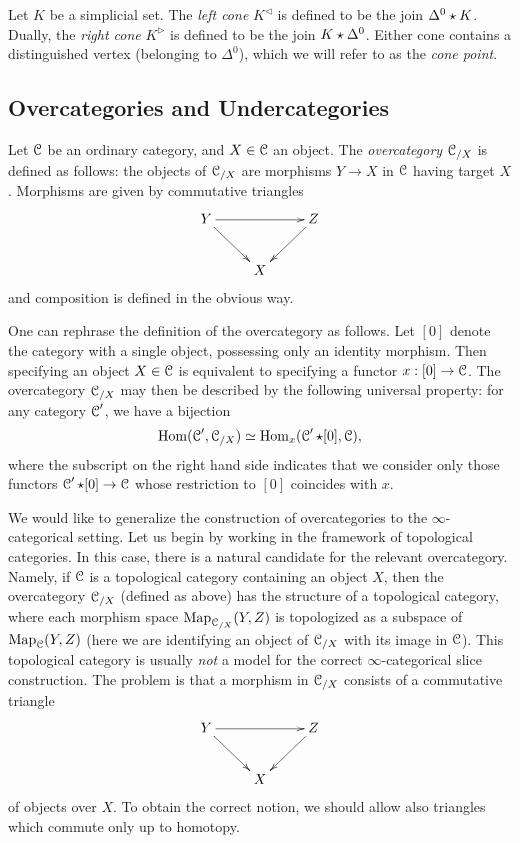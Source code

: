 \begin{1.2.8 Joins of inf-cats}
\begin{notation}
Let $K$ be a simplicial set. The {\it left cone} $K^{\triangleleft}$ is defined to be
the join $\Delta^0 \star K$. Dually, the {\it right cone} $K^{\triangleright}$ is defined to be the join $K \star \Delta^0$. Either cone contains a distinguished vertex (belonging to $\Delta^0$), which we will refer to as the {\it cone point}.
\end{notation}
\end{1.2.8 Joins of inf-cats}
\subsection{Overcategories and Undercategories}\label{slices}
\begin{1.2.9 Over- and under-categories}
Let $\operatorname{\mathcal{C}}$ be an ordinary category, and $X \in \operatorname{\mathcal{C}}$ an object.
The {\it overcategory} $\operatorname{\mathcal{C}}_{/X}$ is defined as follows:
the objects of $\operatorname{\mathcal{C}}_{/X}$ are
morphisms $Y \rightarrow X$ in $\operatorname{\mathcal{C}}$ having target $X$.
Morphisms are given by commutative triangles
$$\xymatrix{ Y \ar[dr] \ar[rr] & & Z \ar[dl] \\
& X }$$
and composition is defined in the obvious way.

One can rephrase the definition of the overcategory as follows.
Let $[0]$ denote the category with a single object, possessing
only an identity morphism. Then specifying an object $X \in \operatorname{\mathcal{C}}$
is equivalent to specifying a functor $x: [0] \rightarrow
\operatorname{\mathcal{C}}$. The overcategory $\operatorname{\mathcal{C}}_{/X}$ may then be described by
the following universal property: for any category $\operatorname{\mathcal{C}}'$, we
have a bijection
$$ \operatorname{Hom}(\operatorname{\mathcal{C}}', \operatorname{\mathcal{C}}_{/X}) \simeq \operatorname{Hom}_{x}(\operatorname{\mathcal{C}}' \star [0],
\operatorname{\mathcal{C}}),$$ where the subscript on the right hand side indicates
that we consider only those functors $\operatorname{\mathcal{C}}' \star [0]
\rightarrow \operatorname{\mathcal{C}}$ whose restriction to $[0]$ coincides with
$x$.

We would like to generalize the construction of overcategories to the $\infty$-categorical setting. 
Let us begin by working in the framework of topological categories. In this case, there is a natural candidate for the relevant overcategory. Namely, if $\operatorname{\mathcal{C}}$ is a topological category containing an object $X$, then the overcategory $\operatorname{\mathcal{C}}_{/X}$ (defined as above) has the structure of a topological category, where each morphism space $\operatorname{{Map}}_{ \operatorname{\mathcal{C}}_{/X} }(Y,Z)$ is topologized as a subspace
of $\operatorname{{Map}}_{\operatorname{\mathcal{C}}}(Y,Z)$ (here we are identifying an object of $\operatorname{\mathcal{C}}_{/X}$ with its image in $\operatorname{\mathcal{C}}$). This topological category is usually {\em
not} a model for the correct $\infty$-categorical slice
construction. The problem is that a morphism in $\operatorname{\mathcal{C}}_{/X}$ consists
of a commutative triangle
$$\xymatrix{ Y \ar[dr] \ar[rr] & & Z \ar[dl] \\
& X }$$
of objects over $X$. To obtain the correct notion, we should allow also
triangles which commute only up to homotopy. 


\end{1.2.9 Over- and under-categories}
